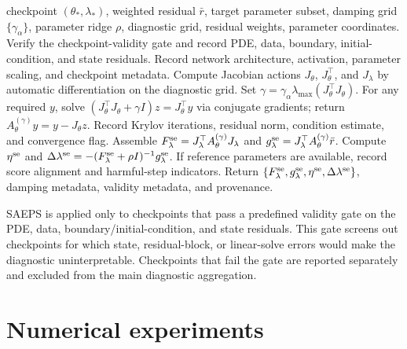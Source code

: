 \documentclass[preprint,12pt]{elsarticle}
\begin{document}
\begin{algorithm}[t]
\caption{SAEPS at a validity-passing checkpoint}
\label{alg:saeps}
\begin{algorithmic}[1]
\REQUIRE checkpoint $(\theta_\ast,\lambda_\ast)$, weighted residual $\bar r$, target parameter subset, damping grid $\{\gamma_\alpha\}$, parameter ridge $\rho$, diagnostic grid, residual weights, parameter coordinates.
\STATE Verify the checkpoint-validity gate and record PDE, data, boundary, initial-condition, and state residuals.
\STATE Record network architecture, activation, parameter scaling, and checkpoint metadata.
\STATE Compute Jacobian actions $J_\theta$, $J_\theta^\top$, and $J_\lambda$ by automatic differentiation on the diagnostic grid.
    \STATE Set $\gamma = \gamma_\alpha\lambda_{\max}(J_\theta^\top J_\theta)$.
    \STATE For any required $y$, solve $(J_\theta^\top J_\theta+\gamma I)z = J_\theta^\top y$ via conjugate gradients; return $A_\theta^{(\gamma)}y = y - J_\theta z$.
    \STATE Record Krylov iterations, residual norm, condition estimate, and convergence flag.
    \STATE Assemble $F_\lambda^{\rm se} = J_\lambda^\top A_\theta^{(\gamma)} J_\lambda$ and $g_\lambda^{\rm se} = J_\lambda^\top A_\theta^{(\gamma)}\bar r$.
    \STATE Compute $\eta^{\rm se}$ and $\Delta\lambda^{\rm se} = -(F_\lambda^{\rm se}+\rho I)^{-1}g_\lambda^{\rm se}$.
    \STATE If reference parameters are available, record score alignment and harmful-step indicators.
\ENDFOR
\STATE Return $\{F_\lambda^{\rm se}, g_\lambda^{\rm se}, \eta^{\rm se}, \Delta\lambda^{\rm se}\}$, damping metadata, validity metadata, and provenance.
\end{algorithmic}
\end{algorithm}

SAEPS is applied only to checkpoints that pass a predefined validity gate on the PDE, data, boundary/initial-condition, and state residuals.  This gate screens out checkpoints for which state, residual-block, or linear-solve errors would make the diagnostic uninterpretable.  Checkpoints that fail the gate are reported separately and excluded from the main diagnostic aggregation.


\section{Numerical experiments}
\end{document}
